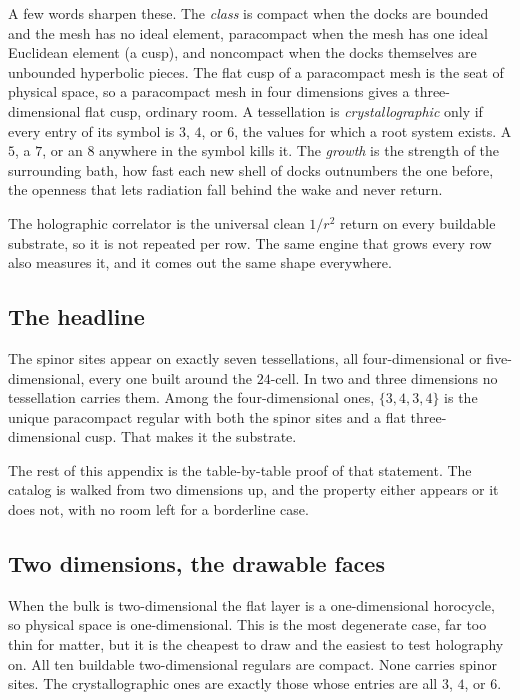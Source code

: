 A few words sharpen these. The \emph{class} is compact when the docks are bounded and the mesh has no ideal element, paracompact when the mesh has one ideal Euclidean element (a cusp), and noncompact when the docks themselves are unbounded hyperbolic pieces. The flat cusp of a paracompact mesh is the seat of physical space, so a paracompact mesh in four dimensions gives a three-dimensional flat cusp, ordinary room. A tessellation is \emph{crystallographic} only if every entry of its symbol is $3$, $4$, or $6$, the values for which a root system exists. A $5$, a $7$, or an $8$ anywhere in the symbol kills it. The \emph{growth} is the strength of the surrounding bath, how fast each new shell of docks outnumbers the one before, the openness that lets radiation fall behind the wake and never return.

The holographic correlator is the universal clean $1/r^2$ return on every buildable substrate, so it is not repeated per row. The same engine that grows every row also measures it, and it comes out the same shape everywhere.

\subsection{The headline}

\begin{result}
The spinor sites appear on exactly seven tessellations, all four-dimensional or five-dimensional, every one built around the $24$-cell. In two and three dimensions no tessellation carries them. Among the four-dimensional ones, $\{3,4,3,4\}$ is the unique paracompact regular with both the spinor sites and a flat three-dimensional cusp. That makes it the substrate.
\end{result}

The rest of this appendix is the table-by-table proof of that statement. The catalog is walked from two dimensions up, and the property either appears or it does not, with no room left for a borderline case.

\subsection{Two dimensions, the drawable faces}

When the bulk is two-dimensional the flat layer is a one-dimensional horocycle, so physical space is one-dimensional. This is the most degenerate case, far too thin for matter, but it is the cheapest to draw and the easiest to test holography on. All ten buildable two-dimensional regulars are compact. None carries spinor sites. The crystallographic ones are exactly those whose entries are all $3$, $4$, or $6$.

